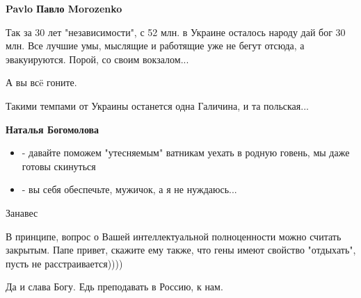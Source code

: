 \begin{itemize}
\begin{itemize}
 
\textbf{Pavlo Павло Morozenko}

Так за 30 лет "независимости", с 52 млн. в Украине осталось народу дай бог 30
млн. Все лучшие умы, мыслящие и работящие уже не бегут отсюда, а эвакуируются.
Порой, со своим вокзалом... \Laughey[1.0][white]

А вы всë гоните.

Такими темпами от Украины останется одна Галичина, и та польская...

\Laughey[1.0][white]\Laughey[1.0][white]

 
\textbf{Наталья Богомолова}

\begin{itemize}
  \item - давайте поможем "утесняемым" ватникам уехать в родную говень, мы даже готовы скинуться
  \item - вы себя обеспечьте, мужичок, а я не нуждаюсь...
\end{itemize}

Занавес

В принципе, вопрос о Вашей интеллектуальной полноценности можно считать
закрытым. Папе привет, скажите ему также, что гены имеют свойство "отдыхать",
пусть не расстраивается))))

\end{itemize}

 
Да и слава Богу. Едь преподавать в Россию, к нам.

\begin{itemize}
 

\end{itemize}
\end{itemize}
